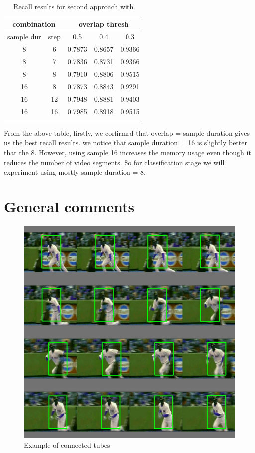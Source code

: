\documentclass{report}
\begin{document}
\begin{center}
\begin{longtable}{||c c||c c c||}

  \hline
  \multicolumn{2}{||c||}{\textbf{combination}} &\multicolumn{3}{|c||}{\textbf{overlap thresh}}\\
  \hline
  sample dur & step &  0.5  &  0.4 &  0.3 \\
  \hline   \hline

  8 & 6 & 0.7873 & 0.8657 & 0.9366  \\
  \hline
  8 & 7 & 0.7836 & 0.8731 & 0.9366  \\
  \hline
  8 &  8 & 0.7910 & 0.8806 & 0.9515 \\
  \hline 

  16 & 8  & 0.7873 & 0.8843 & 0.9291 \\
  \hline
  16 & 12 & 0.7948 & 0.8881 & 0.9403 \\
  \hline
  16 & 16 & 0.7985 & 0.8918 & 0.9515 \\
  \hline \hline
  \caption{Recall results for second approach with  }
  \label{table:conn_app3}
\end{longtable} 
\end{center}

From the above table, firstly, we corfirmed that overlap = sample duration gives us the best recall results. we notice that sample duration = 16 is
slightly better that the 8. However, using sample 16 increases the memory usage even though it reduces the number of video segments. So for classification stage
we will experiment using mostly sample duration = 8.

\section {General comments}

\begin{figure}[h]
  \centering
  \includegraphics[scale=0.25]{tube_ex_half}
  \caption{Example of connected tubes}
  \label{fig:tube_ex}
\end{figure}
\end{document}
